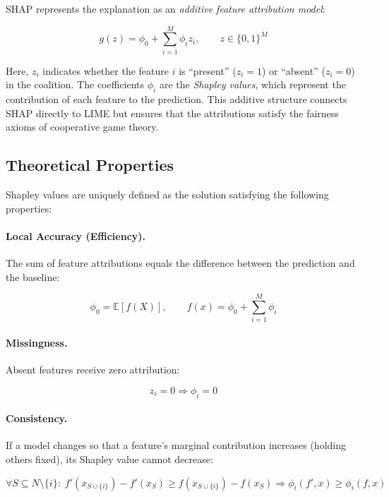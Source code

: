 SHAP represents the explanation as an \textit{additive feature attribution model}:

\begin{equation}
g(z) = \phi_0 + \sum_{i=1}^{M} \phi_i z_i,
\qquad z \in \{0,1\}^M
\end{equation}

Here, $z_i$ indicates whether the feature $i$ is ``present'' ($z_i=1$) or ``absent'' ($z_i=0$) in the coalition.  
The coefficients $\phi_i$ are the \textit{Shapley values}, which represent the contribution of each feature to the prediction.  
This additive structure connects SHAP directly to LIME but ensures that the attributions satisfy the fairness axioms of cooperative game theory.

\subsection{Theoretical Properties}

Shapley values are uniquely defined as the solution satisfying the following properties:

\paragraph{Local Accuracy (Efficiency).}
The sum of feature attributions equals the difference between the prediction and the baseline:

\begin{equation}
\phi_0 = \mathbb{E}[f(X)], 
\qquad
f(x) = \phi_0 + \sum_{i=1}^{M} \phi_i
\end{equation}

\paragraph{Missingness.}
Absent features receive zero attribution:

\begin{equation}
z_i = 0 \Rightarrow \phi_i = 0
\end{equation}

\paragraph{Consistency.}
If a model changes so that a feature’s marginal contribution increases (holding others fixed), its Shapley value cannot decrease:

\begin{equation}
\forall S \subseteq N \setminus \{i\}:\;
f'(x_{S \cup \{i\}}) - f'(x_S) \ge f(x_{S \cup \{i\}}) - f(x_S)
\Rightarrow
\phi_i(f',x) \ge \phi_i(f,x)
\end{equation}


